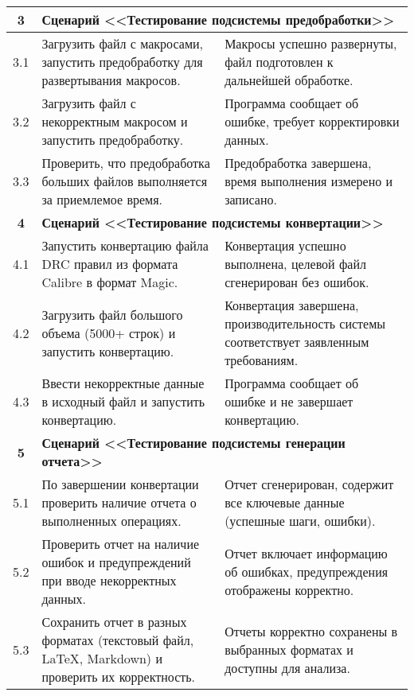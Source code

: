 \begin{longtable}{|c|p{7.5cm}|p{7.5cm}|}
	\textbf{3}
	& \multicolumn{2}{|l|}{\textbf{
		Сценарий <<Тестирование подсистемы предобработки>>}} \\ \hline
	3.1
	& Загрузить файл с макросами,
	запустить предобработку для развертывания макросов.
	& Макросы успешно развернуты,
	файл подготовлен к дальнейшей обработке. \\ \hline

	3.2
	& Загрузить файл с некорректным макросом и запустить предобработку.
	& Программа сообщает об ошибке, требует корректировки данных. \\ \hline

	3.3
	& Проверить,
	что предобработка больших файлов выполняется за приемлемое время.
	& Предобработка завершена, время выполнения измерено и записано. \\ \hline

	\textbf{4}
	& \multicolumn{2}{|l|}{\textbf{
		Сценарий <<Тестирование подсистемы конвертации>>}} \\ \hline
	4.1
	& Запустить конвертацию файла DRC правил из формата Calibre в формат Magic.
	& Конвертация успешно выполнена,
	целевой файл сгенерирован без ошибок. \\ \hline

	4.2
	& Загрузить файл большого объема (5000+ строк) и запустить конвертацию.
	& Конвертация завершена,
	производительность системы соответствует заявленным требованиям. \\ \hline

	4.3
	& Ввести некорректные данные в исходный файл и запустить конвертацию.
	& Программа сообщает об ошибке и не завершает конвертацию. \\ \hline

	\textbf{5}
	& \multicolumn{2}{|l|}{\textbf{
		Сценарий <<Тестирование подсистемы генерации отчета>>}}  \\ \hline
	5.1
	& По завершении конвертации проверить наличие
	отчета о выполненных операциях.
	& Отчет сгенерирован,
	содержит все ключевые данные (успешные шаги, ошибки). \\ \hline

	5.2
	& Проверить отчет на наличие ошибок
	и предупреждений при вводе некорректных данных.
	& Отчет включает информацию об ошибках,
	предупреждения отображены корректно. \\ \hline

	5.3
	& Сохранить отчет в разных форматах (текстовый файл, LaTeX, Markdown)
	и проверить их корректность.
	& Отчеты корректно сохранены в выбранных форматах
	и доступны для анализа. \\ \hline
\end{longtable}

